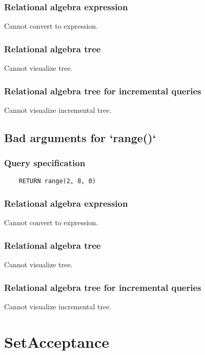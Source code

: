 	\subsubsection*{Relational algebra expression}

	Cannot convert to expression.

	\subsubsection*{Relational algebra tree}

	Cannot visualize tree.

	\subsubsection*{Relational algebra tree for incremental queries}

	Cannot visualize incremental tree.
	\subsection{Bad arguments for `range()`}

	\subsubsection*{Query specification}

	\begin{lstlisting}
	RETURN range(2, 8, 0)
	\end{lstlisting}


	\subsubsection*{Relational algebra expression}

	Cannot convert to expression.

	\subsubsection*{Relational algebra tree}

	Cannot visualize tree.

	\subsubsection*{Relational algebra tree for incremental queries}

	Cannot visualize incremental tree.

	\section{SetAcceptance}

